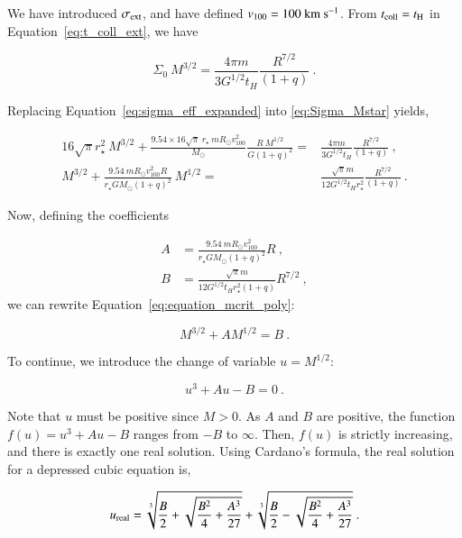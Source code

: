 \begin{appendixs}
	We have introduced $\sigma_{\rm ext}$, and have defined $v_{100} = 100~{\rm km}~{\rm s}^{-1}$. From $t_{\rm coll} = t_{\rm H}$ in Equation~\eqref{eq:t_coll_ext}, we have
	
	\begin{equation}
		\label{eq:Sigma_Mstar}
		\Sigma_0~M^{3/2} = \frac{4 \pi m}{3 G^{1/2}t_H} \frac{R^{7/2}}{(1+q)}~.
	\end{equation}
	
	Replacing Equation~\eqref{eq:sigma_eff_expanded} into \eqref{eq:Sigma_Mstar} yields,
	
	
	\begin{align}
		16\sqrt{\pi} r_\star^2~M^{3/2} + \frac{9.54\times16\sqrt{\pi} ~r_\star~ mR_\odot v_{100}^2}{M_\odot} \frac{R~M^{1/2}}{G(1+q)^2} =& \frac{4 \pi m}{3 G^{1/2}t_H} \frac{R^{7/2}}{(1+q)} ~,\\
		M^{3/2} + \frac{9.54 ~ mR_\odot v_{100}^2 R}{r_{\star} G M_{\odot} (1+q)^2}~M^{1/2} =& \frac{\sqrt{\pi} m}{12 G^{1/2}t_H r_\star^2} \frac{R^{7/2}}{(1+q)}~.
		\label{eq:equation_mcrit_poly}
	\end{align}
	
	Now, defining the coefficients
	
	\begin{align}
		A &= \frac{9.54 ~ mR_\odot v_{100}^2}{r_\star G M_\odot (1+q)^2}R ~,\\
		B &= \frac{\sqrt{\pi} m}{12 G^{1/2}t_H r_\star^2 (1+q)}R^{7/2}~,
	\end{align}
	we can rewrite Equation~\eqref{eq:equation_mcrit_poly}:
	
	\begin{equation}
		M^{3/2} + A M^{1/2} = B~.
	\end{equation}
	
	To continue, we introduce the change of variable $u=M^{1/2}$:
	
	\begin{equation}
		u^3 + A u - B = 0~.
	\end{equation}
	
	Note that $u$ must be positive since $M > 0$. As $A$ and $B$ are positive, the function $f(u) = u^3 + Au - B$ ranges from $-B$ to $\infty$. Then, $f(u)$ is strictly increasing, and there is exactly one real solution. Using Cardano's formula, the real solution for a depressed cubic equation is,
	
	\begin{equation}
		u_{\rm real} = \sqrt[3]{\frac{B}{2}+\sqrt{\frac{B^2}{4} + \frac{A^3}{27}}} + \sqrt[3]{\frac{B}{2}-\sqrt{\frac{B^2}{4} + \frac{A^3}{27}}}~.
	\end{equation}
	

\end{appendixs}
